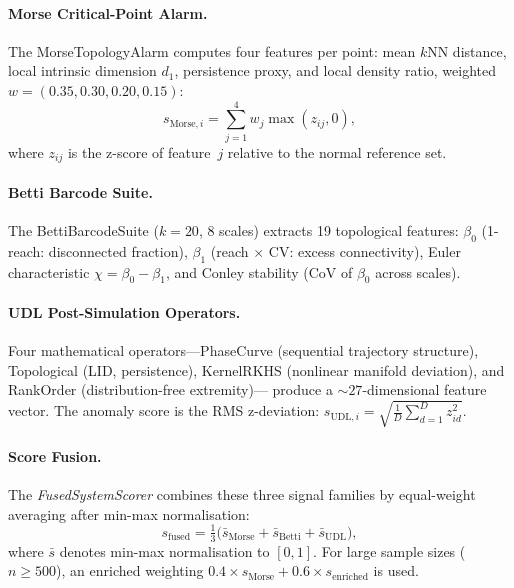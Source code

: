 \documentclass[final]{siamltex}
\begin{document}
\paragraph{Morse Critical-Point Alarm.}
The MorseTopologyAlarm computes four features per point: mean $k$NN
distance, local intrinsic dimension $d_1$, persistence proxy, and
local density ratio, weighted $w = (0.35, 0.30, 0.20, 0.15)$:
\begin{equation}\label{eq:morse}
  s_{\mathrm{Morse},i} = \sum_{j=1}^{4} w_j\max(z_{ij}, 0),
\end{equation}
where $z_{ij}$ is the z-score of feature~$j$ relative to the
normal reference set.

\paragraph{Betti Barcode Suite.}
The BettiBarcodeSuite ($k=20$, 8 scales) extracts 19 topological
features: $\beta_0$ (1-reach: disconnected fraction),
$\beta_1$ (reach $\times$ CV: excess connectivity),
Euler characteristic $\chi = \beta_0 - \beta_1$, and
Conley stability (CoV of $\beta_0$ across scales).

\paragraph{UDL Post-Simulation Operators.}
Four mathematical operators---PhaseCurve (sequential trajectory
structure), Topological (LID, persistence), KernelRKHS (nonlinear
manifold deviation), and RankOrder (distribution-free extremity)---
produce a $\sim\!27$-dimensional feature vector.  The anomaly
score is the RMS z-deviation:
$s_{\mathrm{UDL},i} = \sqrt{\tfrac{1}{D}\sum_{d=1}^{D} z_{id}^2}$.

\paragraph{Score Fusion.}
The \emph{FusedSystemScorer} combines these three signal families
by equal-weight averaging after min-max normalisation:
\begin{equation}\label{eq:fusion}
  s_{\mathrm{fused}} = \tfrac{1}{3}\bigl(
  \bar{s}_{\mathrm{Morse}} + \bar{s}_{\mathrm{Betti}}
  + \bar{s}_{\mathrm{UDL}}\bigr),
\end{equation}
where $\bar{s}$ denotes min-max normalisation to $[0,1]$.
For large sample sizes ($n \ge 500$), an enriched weighting
$0.4 \times s_{\mathrm{Morse}} + 0.6 \times s_{\mathrm{enriched}}$
is used.
\end{document}
